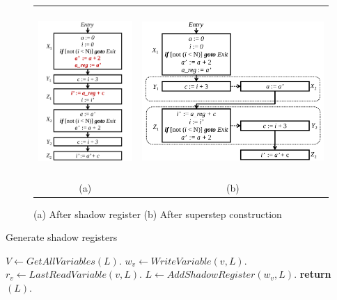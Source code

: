 \begin{enumerate}
\begin{figure}[t!]
\begin{center}
\begin{tabular}{cc}
\includegraphics[height=2.5in]{fig-rpe/algorithm-after-shadow-register}
&
\includegraphics[height=2.5in]{fig-rpe/algorithm-after-superset-construction}
\\
(a) & (b)
\end{tabular}
\end{center}
\caption{(a) After shadow register (b) After superstep construction}
\label{fig:algo2}
\end{figure}

\begin{algorithm}
\caption{Generate shadow registers} \label{algo:generate-pipeline-registers}
\begin{algorithmic}[1]
\State $V \leftarrow GetAllVariables(L)$.
\State $w_v \leftarrow WriteVariable (v, L)$.
\State $r_v \leftarrow LastReadVariable (v, L)$.
\State $L \leftarrow AddShadowRegister (w_v, L)$.
\EndIf
\EndFor
\State \textbf{return} $(L)$.
\EndProcedure
\end{algorithmic}
\end{algorithm}


\end{enumerate}
